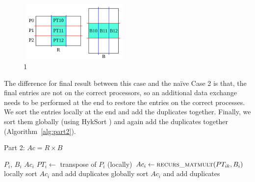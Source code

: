 \begin{figure}[tbh]
 \centering
 \includegraphics[width=5.5cm,height=3cm]{./figures/part2e.pdf}
 \caption{1}
 \label{fig:part2e}
\end{figure}

The difference for final result between this case and the na\"{i}ve Case 2 is that, the final entries are not on the correct processors, so an additional data exchange needs to be performed at the end to restore the entries on the correct processes. We sort the entries locally at the end and add the duplicates together. Finally, we sort them globally (using HykSort \cite{Sundar:2013}) and again add the duplicates together (Algorithm~\ref{alg:part2}).

\begin{algorithm}[H] 
  \caption{Part 2: $Ac = R \times B$} \label{alg:part2} 
  \begin{algorithmic}[1]
    \Require $P_i$, $B_i$
    \Ensure  $Ac_i$
    \State $PT_i \leftarrow$ transpose of $P_i$ (locally)
      \State $Ac_i \leftarrow \textsc{recurs\_matmult}(PT_{ik}, B_i)$
    \EndFor
    \State locally sort $Ac_i$ and add duplicates
    \State globally sort $Ac_i$ and add duplicates
  \end{algorithmic}
\end{algorithm}
